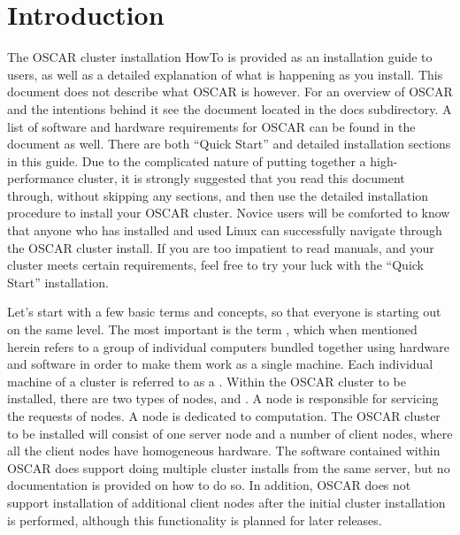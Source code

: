 %
%
%

\section{Introduction}

The OSCAR cluster installation HowTo is provided as an installation
guide to users, as well as a detailed explanation of what is happening
as you install. This document does not describe what OSCAR is however.
For an overview of OSCAR and the intentions behind it see the
 document located in the docs subdirectory.
A list of software and hardware requirements for OSCAR can be found in
the  document as well. 
\begchange
There are both ``Quick Start'' and detailed installation sections in
this guide. Due to the complicated nature of putting together a 
high-performance cluster, it is strongly suggested that you read this 
document through, without skipping any sections, and then use the
detailed installation procedure to install your OSCAR cluster.
Novice users will be comforted to know that anyone who has installed
and used Linux can successfully navigate through the OSCAR cluster install.
If you are too impatient to read manuals, and your cluster meets
certain requirements, feel free to try your luck with the ``Quick Start''
installation.
\endchange

Let's start with a few basic terms and concepts, so that everyone is
starting out on the same level. The most important is the term
, which when mentioned herein refers to a group of
individual computers bundled together using hardware and software in
order to make them work as a single machine. Each individual machine
of a cluster is referred to as a . Within the OSCAR cluster
to be installed, there are two types of nodes,  and
. A  node is responsible for servicing the
requests of  nodes.  A  node is dedicated to
computation.  The OSCAR cluster to be installed will consist of one
server node and a number of client nodes, where all the client nodes
have homogeneous hardware.  The software contained within OSCAR does
support doing multiple cluster installs from the same server, but no
documentation is provided on how to do so. In addition, OSCAR does not
support installation of additional client nodes after the initial
cluster installation is performed, although this functionality is
planned for later releases.

